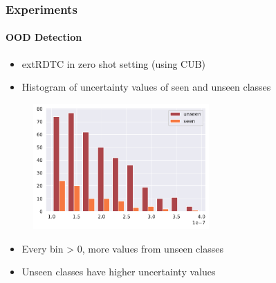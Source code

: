 \documentclass[9pt]{beamer}
\begin{document}
\begin{frame}
\frametitle{Experiments}
\framesubtitle{OOD Detection}
\begin{itemize}
	\item extRDTC in zero shot setting (using CUB)
	\item Histogram of uncertainty values of seen and unseen classes
\end{itemize}
\begin{figure}
	\centering
	\includegraphics[width=0.6\textwidth]{images/zero_shot_class_uncertainty_median_hist.pdf}
\end{figure}
\begin{itemize}
	\item Every bin > 0, more values from unseen classes
	\item Unseen classes have higher uncertainty values
\end{itemize}
\end{frame} 
\end{document}
